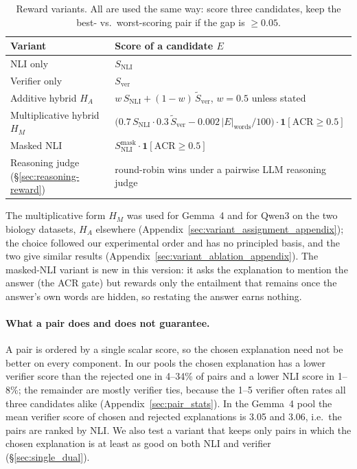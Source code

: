 \begin{table}[t]
\centering
\small
\caption{Reward variants. All are used the same way: score three candidates, keep the best- vs.\ worst-scoring pair if the gap is $\geq 0.05$.}
\label{tab:rewards}
\begin{tabular}{ll}
\toprule
Variant & Score of a candidate $E$ \\
\midrule
NLI only & $S_\text{NLI}$ \\
Verifier only & $S_\text{ver}$ \\
Additive hybrid $H_A$ & $w\,S_\text{NLI} + (1-w)\,\tilde S_\text{ver}$, \; $w{=}0.5$ unless stated \\
Multiplicative hybrid $H_M$ & $\bigl(0.7\,S_\text{NLI}\cdot 0.3\,\tilde S_\text{ver} - 0.002\,|E|_\text{words}/100\bigr)\cdot \mathbf{1}[\mathrm{ACR}\geq 0.5]$ \\
Masked NLI & $S_\text{NLI}^\text{mask}\cdot \mathbf{1}[\mathrm{ACR}\geq 0.5]$ \\
Reasoning judge (\S\ref{sec:reasoning-reward}) & round-robin wins under a pairwise LLM reasoning judge \\
\bottomrule
\end{tabular}
\end{table}

The multiplicative form $H_M$ was used for Gemma~4 and for Qwen3 on the two biology datasets, $H_A$ elsewhere (Appendix~\ref{sec:variant_assignment_appendix}); the choice followed our experimental order and has no principled basis, and the two give similar results (Appendix~\ref{sec:variant_ablation_appendix}). The masked-NLI variant is new in this version: it asks the explanation to mention the answer (the ACR gate) but rewards only the entailment that remains once the answer's own words are hidden, so restating the answer earns nothing.

\paragraph{What a pair does and does not guarantee.} A pair is ordered by a single scalar score, so the chosen explanation need not be better on every component. In our pools the chosen explanation has a lower verifier score than the rejected one in 4--34\% of pairs and a lower NLI score in 1--8\%; the remainder are mostly verifier ties, because the 1--5 verifier often rates all three candidates alike (Appendix~\ref{sec:pair_stats}). In the Gemma~4 pool the mean verifier score of chosen and rejected explanations is 3.05 and 3.06, i.e.\ the pairs are ranked by NLI. We also test a variant that keeps only pairs in which the chosen explanation is at least as good on both NLI and verifier (\S\ref{sec:single_dual}).

